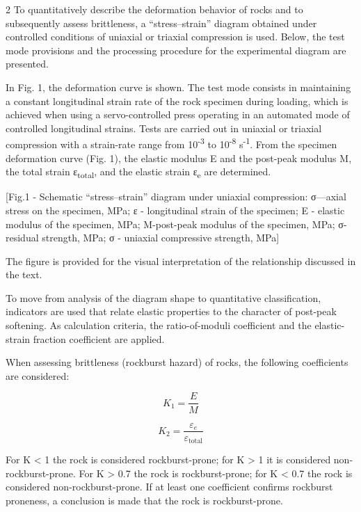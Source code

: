 \begin{multicols}{2}
To quantitatively describe the deformation behavior of rocks and to
subsequently assess brittleness, a ``stress--strain'' diagram obtained
under controlled conditions of uniaxial or triaxial compression is used.
Below, the test mode provisions and the processing procedure for the
experimental diagram are presented.

In Fig. 1, the deformation curve is shown. The test mode consists in
maintaining a constant longitudinal strain rate of the rock specimen
during loading, which is achieved when using a servo-controlled press
operating in an automated mode of controlled longitudinal strains. Tests
are carried out in uniaxial or triaxial compression with a strain-rate
range from 10\textsuperscript{-3} to 10\textsuperscript{-8}
s\textsuperscript{-1}. From the specimen deformation curve (Fig. 1), the
elastic modulus E and the post-peak modulus M, the total strain
ε\textsubscript{total}, and the elastic strain ε\textsubscript{e} are
determined.

[Fig.1 - Schematic ``stress--strain'' diagram under
uniaxial compression: σ---axial stress on the specimen, MPa;
ε - longitudinal strain of the specimen; E - elastic modulus of
the specimen, MPa; M-post-peak modulus of the specimen, MPa; σ- residual strength, MPa; σ - uniaxial compressive strength,
MPa]

The figure is provided for the visual interpretation of the relationship
discussed in the text.

To move from analysis of the diagram shape to quantitative
classification, indicators are used that relate elastic properties to
the character of post-peak softening. As calculation criteria, the
ratio-of-moduli coefficient and the elastic-strain fraction coefficient
are applied.

When assessing brittleness (rockburst hazard) of rocks, the following
coefficients are considered:

\begin{equation*}
K_{1} = \frac{E}{M}
\end{equation*}

\begin{equation*}
K_{2} = \frac{\varepsilon_{e}}{\varepsilon_{\text{total}}}
\end{equation*}

For K <{} 1 the rock is considered
rockburst-prone; for K \textgreater{} 1 it is
considered non-rockburst-prone. For K \textgreater{}
0.7 the rock is rockburst-prone; for K <{} 0.7
the rock is considered non-rockburst-prone. If at least one coefficient
confirms rockburst proneness, a conclusion is made that the rock is
rockburst-prone.


\end{multicols}

